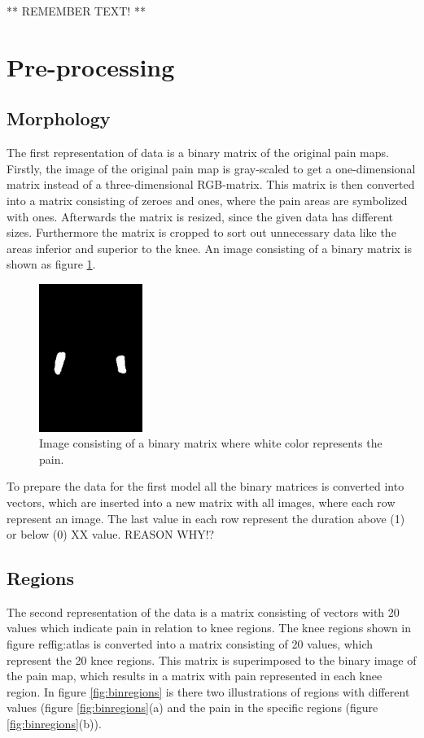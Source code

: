** REMEMBER TEXT! **

\section{Pre-processing}

\subsection{Morphology} \label{sec:Morph}
The first representation of data is a binary matrix of the original pain maps. 
Firstly, the image of the original pain map is gray-scaled to get a one-dimensional matrix instead of a three-dimensional RGB-matrix. This matrix is then converted into a matrix consisting of zeroes and ones, where the pain areas are symbolized with ones. Afterwards the matrix is resized, since the given data has different sizes. Furthermore the matrix is cropped to sort out unnecessary data like the areas inferior and superior to the knee. An image consisting of a binary matrix is shown as figure \ref{fig:cropbin7}.

\begin{figure} [H]
\centering
\includegraphics[width=0.3\textwidth]{figures/cropbin7}
\caption{Image consisting of a binary matrix where white color represents the pain.}
\label{fig:cropbin7}
\end{figure}

\noindent
To prepare the data for the first model all the binary matrices is converted into vectors, which are inserted into a new matrix with all images, where each row represent an image. The last value in each row represent the duration above (1) or below (0) XX value. REASON WHY!?

\subsection{Regions}
The second representation of the data is a matrix consisting of vectors with 20 values which indicate pain in relation to knee regions. 
The knee regions shown in figure ref{fig:atlas} is converted into a matrix consisting of 20 values, which represent the 20 knee regions. This matrix is superimposed to the binary image of the pain map, which results in a matrix with pain represented in each knee region. In figure \ref{fig:binregions} is there two illustrations of regions with different values (figure \ref{fig:binregions}(a) and the pain in the specific regions (figure \ref{fig:binregions}(b)).

